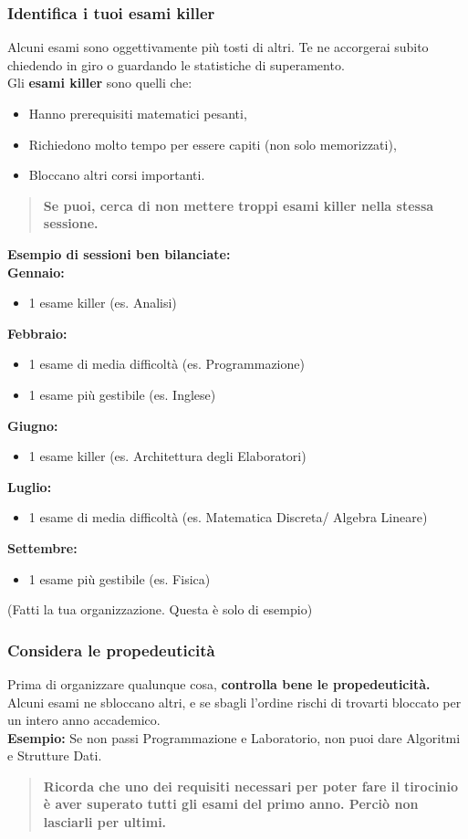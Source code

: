 \documentclass[18pt]{extarticle}
\begin{document}
\subsubsection{Identifica i tuoi esami killer}
Alcuni esami sono oggettivamente più tosti di altri. Te ne accorgerai subito chiedendo in giro o guardando le statistiche di superamento.\\
Gli \textbf{esami killer} sono quelli che:
\begin{itemize}
\item Hanno prerequisiti matematici pesanti,
\item Richiedono molto tempo per essere capiti (non solo memorizzati),
\item Bloccano altri corsi importanti.
\end{itemize}
\begin{quote}
\textbf{Se puoi, cerca di non mettere troppi esami killer nella stessa sessione.}
\end{quote}
\textbf{Esempio di sessioni ben bilanciate:}\\
\textbf{Gennaio:}
\begin{itemize}
\item 1 esame killer (es. Analisi)
\end{itemize}
\textbf{Febbraio:}
\begin{itemize}
\item 1 esame di media difficoltà (es. Programmazione)
\item 1 esame più gestibile (es. Inglese)
\end{itemize}
\textbf{Giugno:}
\begin{itemize}
\item 1 esame killer (es. Architettura degli Elaboratori)
\end{itemize}
\textbf{Luglio:}
\begin{itemize}
\item 1 esame di media difficoltà (es. Matematica Discreta/ Algebra Lineare)
\end{itemize}
\textbf{Settembre:}
\begin{itemize}
\item 1 esame più gestibile (es. Fisica)
\end{itemize}
(Fatti la tua organizzazione. Questa è solo di esempio)


\subsubsection{Considera le propedeuticità}
Prima di organizzare qualunque cosa, \textbf{controlla bene le propedeuticità.}  
Alcuni esami ne sbloccano altri, e se sbagli l'ordine rischi di trovarti bloccato per un intero anno accademico.\\
\textbf{Esempio:} Se non passi Programmazione e Laboratorio, non puoi dare Algoritmi e Strutture Dati.\\
\begin{quote}
\textbf{Ricorda che uno dei requisiti necessari per poter fare il tirocinio è aver superato tutti gli esami del primo anno. Perciò non lasciarli per ultimi.}
\end{quote}
\end{document}
